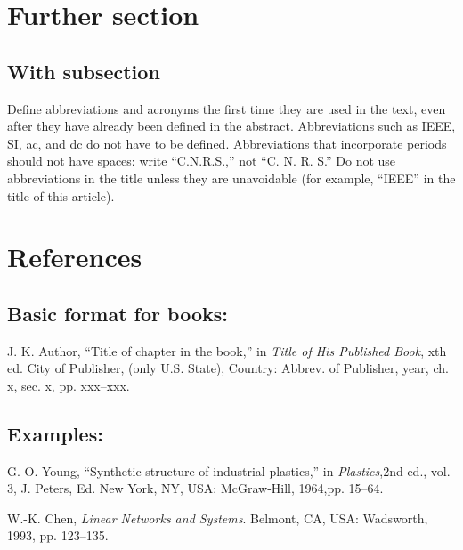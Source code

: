 \documentclass[12pt,conference]{IEEEtran}
\begin{document}
\section{Further section}


\subsection{With subsection}

Define abbreviations and acronyms the first time they are used in the text, even after they have already been defined in the abstract. Abbreviations such as IEEE, SI, ac, and dc do not have to be defined. Abbreviations that incorporate periods should not have spaces: write ``C.N.R.S.,'' not ``C. N. R. S.'' Do not use abbreviations in the title unless they are unavoidable (for example, ``IEEE'' in the title of this article).

\section*{References}

\subsection*{Basic format for books:}\vspace*{-12pt}
\def\refname{}
\begin{thebibliography}{34}
\item[] J. K. Author, ``Title of chapter in the book,'' in {\em Title of His Published Book}, xth ed. City of Publisher, (only U.S. State), Country: Abbrev. of Publisher, year, ch. x, sec. x, pp. xxx--xxx.
\end{thebibliography}

\subsection*{Examples:}
\def\refname{}
\begin{thebibliography}{34}\vspace*{-12pt}

\bibitem{}G. O. Young, ``Synthetic structure of industrial plastics,'' in {\em Plastics},\break 2nd ed., vol. 3, J. Peters, Ed. New York, NY, USA: McGraw-Hill, 1964,\break pp. 15--64.

\bibitem{}W.-K. Chen, {\it Linear Networks and Systems}. Belmont, CA, USA: Wadsworth, 1993, pp. 123--135.

\end{thebibliography}
\end{document}
